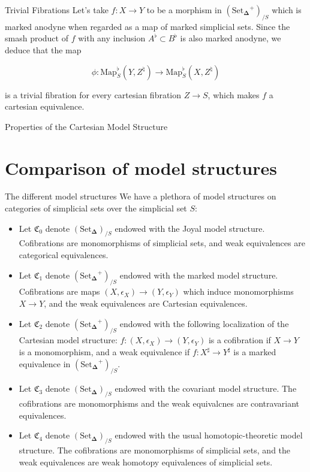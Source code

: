 \documentclass{beamer}[9pt]
\newcommand{\8}{\ensuremath{\infty}}
\newcommand{\C}{\ensuremath{\mathfrak{C}}}
\newcommand{\SSet}{\ensuremath{\text{Set}_{\boldsymbol{\Delta}}}}
\newcommand{\Map}{\ensuremath{\text{Map}}}
\begin{document}
\begin{frame}{Trivial Fibrations}
  Let's take $f: X \rightarrow Y$ to be a morphism in $(\SSet^+)_{/S}$ which is marked anodyne when regarded as a map of marked simplicial sets. Since the smash product of $f$ with any inclusion $A^\flat\subset B^\flat$ is also marked anodyne, we deduce that the map

  $$
    \phi: \Map_S^\flat(Y, Z^\natural) \rightarrow \Map_S^\flat(X, Z^\natural)
  $$

  is a trivial fibration for every cartesian fibration $Z \rightarrow S$, which makes $f$ a cartesian equivalence.
\end{frame}

\begin{frame}{Properties of the Cartesian Model Structure}
\end{frame}

\section{Comparison of model structures}

\begin{frame}{The different model structures}
  We have a plethora of model structures on categories of simplicial sets over the simplicial set $S$:

  \begin{itemize}
    \item<1->[(0)] Let $\C_0$ denote $(\SSet)_{/S}$ endowed with the Joyal model structure. Cofibrations are monomorphisms of simplicial sets, and weak equivalences are categorical equivalences.
    \item<2>[(1)]  Let $\C_1$ denote $(\SSet^+)_{/S}$ endowed with the marked model structure. Cofibrations are maps $(X, \epsilon_X) \rightarrow (Y, \epsilon_Y)$ which induce monomorphisms $X \rightarrow Y$, and the weak equivalences are Cartesian equivalences.
  \end{itemize}
\end{frame}

\begin{frame}
  \begin{itemize}
    \item<1->[(2)]  Let $\C_2$ denote $(\SSet^+)_{/S}$ endowed with the following localization of the Cartesian model structure: $f : (X, \epsilon_X) \rightarrow (Y, \epsilon_Y)$ is a cofibration if $X \rightarrow Y$ is a monomorphism, and a weak equivalence if $f : X^\sharp \rightarrow Y^\sharp$ is a marked equivalence in $(\SSet^+)_{/S}$.
    \item<2->[(3)]  Let $\C_3$ denote $(\SSet)_{/S}$ endowed with the covariant model structure. The cofibrations are monomorphisms and the weak equivalcnes are contravariant equivalences.
    \item<3>[(4)] Let $\C_4$ denote $(\SSet)_{/S}$ endowed with the usual homotopic-theoretic model structure. The cofibrations are monomorphisms of simplicial sets, and the weak equivalences are weak homotopy equivalences of simplicial sets.
  \end{itemize}
\end{frame}
\end{document}
